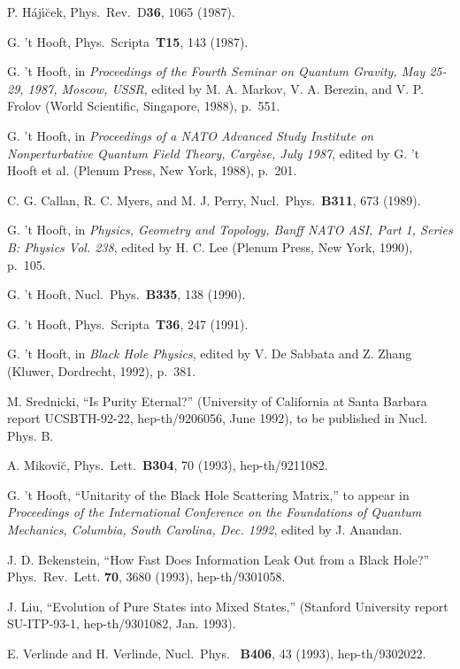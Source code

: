 \begin{thebibliography}{999}
 P. H\'{a}j\'{\i}\u{c}ek, Phys.\ Rev.\ D{\bf 36}, 1065
(1987).

 G. 't Hooft, Phys.\ Scripta\ {\bf T15}, 143 (1987).

 G. 't Hooft, in {\em Proceedings of the Fourth
Seminar
on Quantum Gravity, May 25-29, 1987, Moscow, USSR}, edited by
M. A. Markov, V. A. Berezin, and V. P. Frolov (World Scientific,
Singapore, 1988), p.~551.

 G. 't Hooft, in {\em Proceedings of a NATO Advanced
Study Institute on Nonperturbative Quantum Field Theory, Carg\`{e}se,
July 1987}, edited by G. 't Hooft et al. (Plenum Press, New York,
1988),
p.~201.

 C. G. Callan, R. C. Myers, and M. J. Perry,
Nucl.\ Phys.\ {\bf B311}, 673 (1989).

 G. 't Hooft, in {\em Physics, Geometry and Topology,
Banff NATO ASI, Part 1, Series B:  Physics Vol. 238}, edited by H. C.
Lee
(Plenum Press, New York, 1990), p.~105.

 G. 't Hooft, Nucl.\ Phys.\ {\bf B335}, 138 (1990).

 G. 't Hooft, Phys.\ Scripta\ {\bf T36}, 247 (1991).

 G. 't Hooft, in {\em Black Hole Physics}, edited by
V. De
Sabbata and Z. Zhang (Kluwer, Dordrecht, 1992), p.~381.

 M. Srednicki, ``Is Purity Eternal?'' (University of
California
at Santa Barbara report UCSBTH-92-22, hep-th/9206056, June 1992),
to be published in Nucl. Phys. B.

 A. Mikovi\u{c}, Phys.\ Lett.\ {\bf B304}, 70 (1993),
hep-th/9211082.

 G. 't Hooft, ``Unitarity of the Black Hole Scattering
Matrix,'' to appear in {\em Proceedings of the International
Conference
on the Foundations of Quantum Mechanics, Columbia, South Carolina,
Dec. 1992}, edited by J. Anandan.

 J. D. Bekenstein, ``How Fast Does Information Leak
Out
from a Black Hole?'' Phys.\ Rev.\ Lett. {\bf 70}, 3680 (1993),
hep-th/9301058.

 J. Liu, ``Evolution of Pure States into Mixed States,''
(Stanford University report SU-ITP-93-1, hep-th/9301082, Jan. 1993).

 E. Verlinde and H. Verlinde, Nucl.\ Phys.\ {\bf
B406},
43 (1993), hep-th/9302022.


\end{thebibliography}
